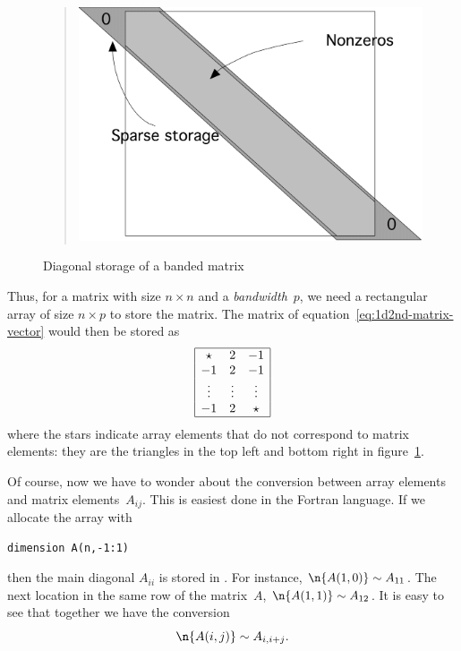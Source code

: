 \begin{figure}[ht]
  \begin{quote}
    \includegraphics[scale=.1]{graphics/sparsediag}
  \end{quote}
  \caption{Diagonal storage of a banded matrix}
  \label{fig:sparsediag}
\end{figure}

Thus, for a matrix with size $n\times n$ and a
\emph{bandwidth}~$p$, we need a
rectangular array of size $n\times p$ to store the matrix. The matrix
of equation~\eqref{eq:1d2nd-matrix-vector} would then be stored as
\begin{equation}
\begin{array}{|ccc|}
  \hline
  \star&2&-1\\
  -1&2&-1\\
  \vdots&\vdots&\vdots\\
  -1&2&\star\\ \hline
\end{array}
\label{eq:2minus1-by-diagonals}
\end{equation}
where the stars indicate array elements that do not correspond to
matrix elements: they are the triangles in the top left and bottom
right in figure~\ref{fig:sparsediag}. 

Of course, now we have to wonder about the conversion between array
elements  and matrix elements~$A_{ij}$. This is easiest done
in the Fortran language. If we allocate the array with
\begin{verbatim}
dimension A(n,-1:1)
\end{verbatim}
then the main diagonal $A_{ii}$ is stored in . For instance,
%
$\n{A(1,0)}\sim A_{11}$. The next location in the same row of the matrix~$A$, 
%
$\n{A(1,1)}\sim A_{12}$. It is easy to see that together we have the
conversion
\begin{equation}
  \n{A(i,j)}\sim A_{i,i+j}.
  \label{eq:sparse-conversion}
\end{equation}


